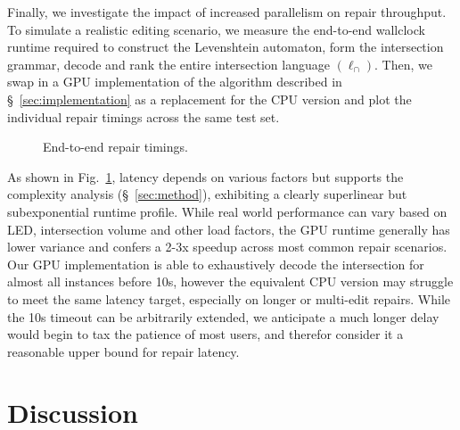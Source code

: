 \documentclass[sigplan,review,acmsmall,nonacm,screen,anonymous]{acmart}\settopmatter{printfolios=false,printccs=false,printacmref=false}
\begin{document}

Finally, we investigate the impact of increased parallelism on repair throughput. To simulate a realistic editing scenario, we measure the end-to-end wallclock runtime required to construct the Levenshtein automaton, form the intersection grammar, decode and rank the entire intersection language $(\ell_\cap)$. Then, we swap in a GPU implementation of the algorithm described in \S~\ref{sec:implementation} as a replacement for the CPU version and plot the individual repair timings across the same test set.
\begin{figure}
\vspace{-0.2cm}
\resizebox{.38\textwidth}{!}{}
\vspace{-0.7cm}
\caption{End-to-end repair timings.}
\label{fig:timings}
\vspace{-0.3cm}
\end{figure}

\noindent As shown in Fig.~\ref{fig:timings}, latency depends on various factors but supports the complexity analysis (\S~\ref{sec:method}), exhibiting a clearly superlinear but subexponential runtime profile. While real world performance can vary based on LED, intersection volume and other load factors, the GPU runtime generally has lower variance and confers a 2-3x speedup across most common repair scenarios. Our GPU implementation is able to exhaustively decode the intersection for almost all instances before 10s, however the equivalent CPU version may struggle to meet the same latency target, especially on longer or multi-edit repairs. While the 10s timeout can be arbitrarily extended, we anticipate a much longer delay would begin to tax the patience of most users, and therefor consider it a reasonable upper bound for repair latency.

\clearpage\section{Discussion}\label{sec:discussion}
\end{document}
